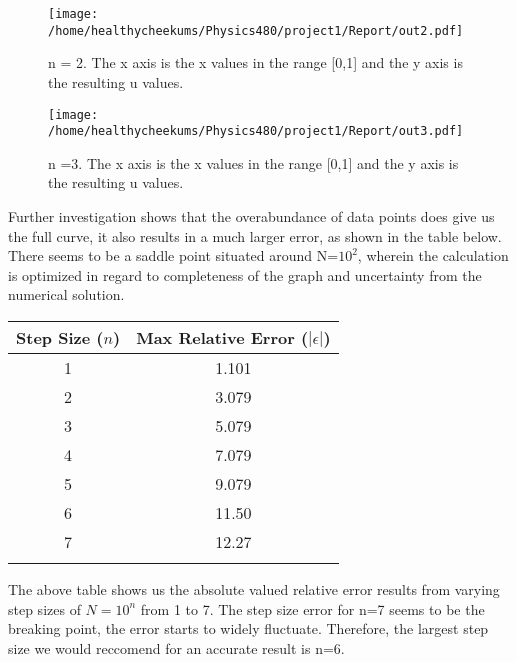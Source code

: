 \documentclass[10pt,showpacs,preprintnumbers,footinbib,amsmath,amssymb,aps,prl,twocolumn,groupedaddress,superscriptaddress,showkeys]{revtex4-1}
\begin{document}
\begin{figure}[!ht]
	\centering
	\texttt{[image: /home/healthycheekums/Physics480/project1/Report/out2.pdf]}

	\label{uvx}
	\caption{n = 2. The x axis is the x values in the range [0,1] and the y axis is the resulting u values.}
\end{figure}

\begin{figure}[!ht]
	\centering
	\texttt{[image: /home/healthycheekums/Physics480/project1/Report/out3.pdf]}

	\label{uvx}
	\caption{n =3.  The x axis is the x values in the range [0,1] and the y axis is the resulting u values.}
\end{figure}

Further investigation shows that the overabundance of data points does give us the full curve, it also results in a much larger error, as shown in the table below. There seems to be a saddle point situated around N=$10^{2}$, wherein the calculation is optimized in regard to completeness of the graph and uncertainty from the numerical solution.

\begin{center}
	\begin{tabular}{cc}
		\hline \hline
			Step Size ($n$) &  Max Relative Error ($|\epsilon|$)\\
			\hline
			1 & 1.101\\
			2 & 3.079\\
			3 & 5.079\\
			4 & 7.079\\
			5 & 9.079\\
			6 & 11.50\\
			7 & 12.27\\
			\hline
			\label{errortable}
	\end{tabular}
\end{center}
	
	The above table shows us the absolute valued relative error results from varying step sizes of $N=10^{n}$ from 1 to 7. The step size error for n=7 seems to be the breaking point, the error starts to widely fluctuate. Therefore, the largest step size we would reccomend for an accurate result is n=6.  
\end{document}
